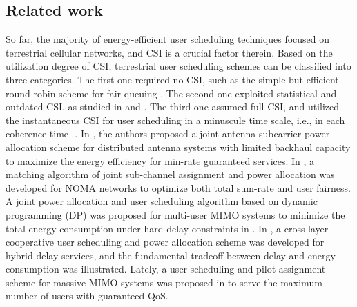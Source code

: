 \documentclass[conference]{IEEEtran}
\begin{document}
 \subsection{Related work}
 
 So far, the majority of energy-efficient user scheduling techniques focused on terrestrial cellular networks, and CSI is a crucial factor therein. 
 Based on the utilization degree of CSI, terrestrial user scheduling schemes can be classified into three categories. The first one required no CSI, such as the simple but efficient round-robin scheme for fair queuing \cite{p51}. The second one exploited statistical and outdated CSI, as studied in \cite{p52} and \cite{p53}. The third one assumed full CSI, and utilized the instantaneous CSI for user scheduling in a minuscule time scale, i.e., in each coherence time \cite{p3}-\cite{p7}. 
 In \cite{p3}, the authors proposed a joint antenna-subcarrier-power allocation scheme for distributed antenna systems with limited backhaul capacity to maximize the energy efficiency for min-rate guaranteed services. In \cite{p6}, a matching algorithm of joint sub-channel assignment and power allocation was developed for NOMA networks to optimize both total sum-rate and user fairness. A joint power allocation and user scheduling algorithm based on dynamic programming (DP) was proposed for multi-user MIMO systems to minimize the total energy consumption under hard delay constraints in \cite{p4}. In \cite{p5}, a cross-layer cooperative user scheduling and power allocation scheme was developed for hybrid-delay services, and the fundamental tradeoff between delay and energy consumption was illustrated. Lately, a user scheduling and pilot assignment scheme for massive MIMO systems was proposed in \cite{p7} to serve the maximum number of users with guaranteed QoS.
 
\end{document}
